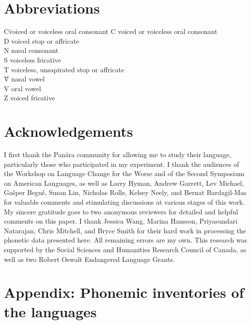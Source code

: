 \documentclass[output=paper,hidelinks]{langscibook}
\begin{document}
\section*{Abbreviations}
\begin{tabbing}
 C\hspace{1em}\= voiced or voiceless oral consonant\kill
 C \> voiced or voiceless oral consonant\\
 D \> voiced stop or affricate\\
 N \> nasal consonant\\
 S \> voiceless fricative\\
 T \> voiceless, unsapirated stop or affricate\\
 Ṽ \> nasal vowel\\
 V \> oral vowel\\
 Z \> voiced fricative
\end{tabbing}

\section*{Acknowledgements}
I first thank the Panãra community for allowing me to study their language, particularly those who participated in my experiment. I thank the audiences of the Workshop on Language Change for the Worse and of the Second Symposium on American Languages, as well as Larry Hyman, Andrew Garrett, Lev Michael, Ga\v{s}per Begu\v{s}, Susan Lin, Nicholas Rolle, Kelsey Neely, and Bernat Bardagil-Mas for valuable comments and stimulating discussions at various stages of this work. My sincere gratitude goes to two anonymous reviewers for detailed and helpful comments on this paper. I thank Jessica Wang, Marina Hansson, Priyasundari Natarajan, Chris Mitchell, and Bryce Smith for their hard work in processing the phonetic data presented here. All remaining errors are my own. This research was supported by the Social Sciences and Humanities Research Council of Canada, as well as two Robert Oswalt Endangered Language Grants.

\section*{Appendix: Phonemic inventories of the  languages}

\end{document}
